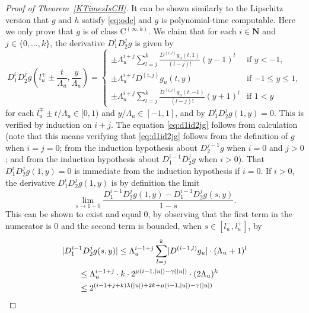 \documentclass{lmcs}
\theoremstyle{definition}
\theoremstyle{remark}
\newcommand{\N}{\mathbf N}
\newcommand{\D}{D}
\newcommand{\classC}{\mathrm C}
\begin{document}
\begin{proof}[Proof of Theorem~\ref{KTimesIsCH}]
It can be shown similarly to the Lipschitz version 
\cite[Theorem 3.2]{kawamura2010lipschitz}
that $g$ and $h$ satisfy \eqref{eq:ode} and $g$ is polynomial-time computable.
Here we only prove that $g$ is of class $\classC^{(\infty, k)}$.
We claim that 
for each $i \in \N$ and $j \in \{0, \dots, k\}$, 
the derivative $\D _1 ^i \D _2 ^j g$ is given by 
\begin{equation}
   \D_1^i \D_2^j g \left(l^\mp_u \pm \frac{t}{\Lambda_u}, \frac{y}{\Lambda_u}\right)
   = \begin{cases}
      \pm \Lambda_u^{i+j} \sum^{k}_{l=j} \frac{\D^{(i,l)} g_u(t,1)}{(l-j)!}
      (y - 1)^l &  \text{if } y < -1,
      \\
      \pm \Lambda_u^{i+j} \D^{(i, j)} g_u(t, y) & \text{if } {-1} \le y \le 1,
      \\
      \pm \Lambda_u^{i+j} \sum^{k}_{l=j} 
      \frac{\D^{(i,l)} g_u(t, -1)}{(l-j)!} (y + 1)^l &  \text{if } 1<y
    \end{cases}  \label{eq:d1id2jg}
\end{equation}
for each $l_u^\mp \pm t/\Lambda_u \in [0,1)$ and $y/\Lambda_u \in [-1, 1]$, 
and by $\D _1 ^i \D _2 ^j g (1, y) = 0$. 
This is verified by induction on $i + j$. 
The equation \eqref{eq:d1id2jg} follows from calculation 
(note that this means verifying 
that \eqref{eq:d1id2jg} follows from the definition of $g$ when $i = j = 0$; 
from the induction hypothesis about $\D _2 ^{j - 1} g$ when $i = 0$ and $j > 0$; 
and from the induction hypothesis about $\D _1 ^{i - 1} \D _2 ^j g$ when $i > 0$).
That $\D _1 ^i \D _2 ^j g (1, y) = 0$ is 
immediate from the induction hypothesis if $i = 0$. 
If $i > 0$, the derivative
$\D_1^i \D_2^j g (1, y)$ is by definition the limit 
\begin{equation}
\lim_{s \to 1 - 0} \frac{\D_1^{i-1} \D_2^j g(1, y) - \D_1^{i-1} \D_2^j g (s, y)}{1 - s}.
\label{eq:limitofderivative}
\end{equation}
This can be shown to exist and equal $0$, 
by observing that the first term in the numerator is $0$
and the second term is bounded, when $s \in [l ^- _u, l ^+ _u]$, by 
 \begin{align}
&
  \lvert
   \D_1^{i-1} \D_2^j g (s, y)
  \rvert
  \le 
  \Lambda_u^{i-1+j} \sum^{k}_{l=j} \lvert \D^{(i-1,l)} g_u \rvert \cdot (\Lambda_u + 1)^l 
  \notag
\\
& \qquad
 \le
  \Lambda_u^{i-1+j}  \cdot k \cdot 2^{\mu(i-1, |u|) - \gamma(|u|)} \cdot (2\Lambda_u)^k
  \notag
\\
& \qquad
  \le 2^{(i-1+j+k)\lambda(|u|) + 2k + \mu(i-1, |u|)  - \gamma(|u|)}

\end{align}
\end{proof}
\end{document}
